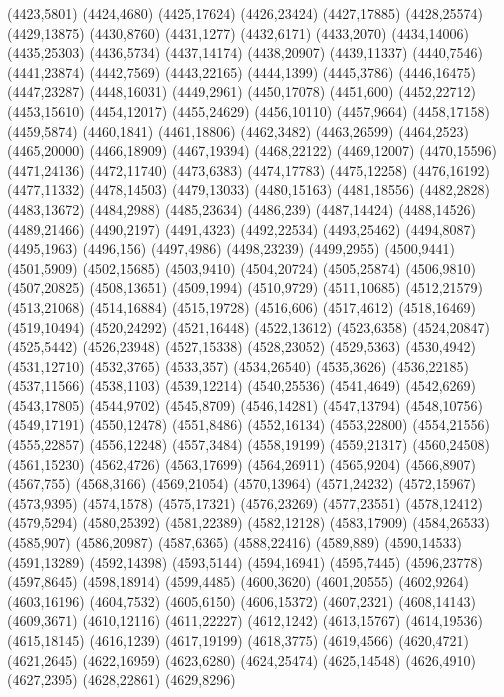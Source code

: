 (4423,5801)
(4424,4680)
(4425,17624)
(4426,23424)
(4427,17885)
(4428,25574)
(4429,13875)
(4430,8760)
(4431,1277)
(4432,6171)
(4433,2070)
(4434,14006)
(4435,25303)
(4436,5734)
(4437,14174)
(4438,20907)
(4439,11337)
(4440,7546)
(4441,23874)
(4442,7569)
(4443,22165)
(4444,1399)
(4445,3786)
(4446,16475)
(4447,23287)
(4448,16031)
(4449,2961)
(4450,17078)
(4451,600)
(4452,22712)
(4453,15610)
(4454,12017)
(4455,24629)
(4456,10110)
(4457,9664)
(4458,17158)
(4459,5874)
(4460,1841)
(4461,18806)
(4462,3482)
(4463,26599)
(4464,2523)
(4465,20000)
(4466,18909)
(4467,19394)
(4468,22122)
(4469,12007)
(4470,15596)
(4471,24136)
(4472,11740)
(4473,6383)
(4474,17783)
(4475,12258)
(4476,16192)
(4477,11332)
(4478,14503)
(4479,13033)
(4480,15163)
(4481,18556)
(4482,2828)
(4483,13672)
(4484,2988)
(4485,23634)
(4486,239)
(4487,14424)
(4488,14526)
(4489,21466)
(4490,2197)
(4491,4323)
(4492,22534)
(4493,25462)
(4494,8087)
(4495,1963)
(4496,156)
(4497,4986)
(4498,23239)
(4499,2955)
(4500,9441)
(4501,5909)
(4502,15685)
(4503,9410)
(4504,20724)
(4505,25874)
(4506,9810)
(4507,20825)
(4508,13651)
(4509,1994)
(4510,9729)
(4511,10685)
(4512,21579)
(4513,21068)
(4514,16884)
(4515,19728)
(4516,606)
(4517,4612)
(4518,16469)
(4519,10494)
(4520,24292)
(4521,16448)
(4522,13612)
(4523,6358)
(4524,20847)
(4525,5442)
(4526,23948)
(4527,15338)
(4528,23052)
(4529,5363)
(4530,4942)
(4531,12710)
(4532,3765)
(4533,357)
(4534,26540)
(4535,3626)
(4536,22185)
(4537,11566)
(4538,1103)
(4539,12214)
(4540,25536)
(4541,4649)
(4542,6269)
(4543,17805)
(4544,9702)
(4545,8709)
(4546,14281)
(4547,13794)
(4548,10756)
(4549,17191)
(4550,12478)
(4551,8486)
(4552,16134)
(4553,22800)
(4554,21556)
(4555,22857)
(4556,12248)
(4557,3484)
(4558,19199)
(4559,21317)
(4560,24508)
(4561,15230)
(4562,4726)
(4563,17699)
(4564,26911)
(4565,9204)
(4566,8907)
(4567,755)
(4568,3166)
(4569,21054)
(4570,13964)
(4571,24232)
(4572,15967)
(4573,9395)
(4574,1578)
(4575,17321)
(4576,23269)
(4577,23551)
(4578,12412)
(4579,5294)
(4580,25392)
(4581,22389)
(4582,12128)
(4583,17909)
(4584,26533)
(4585,907)
(4586,20987)
(4587,6365)
(4588,22416)
(4589,889)
(4590,14533)
(4591,13289)
(4592,14398)
(4593,5144)
(4594,16941)
(4595,7445)
(4596,23778)
(4597,8645)
(4598,18914)
(4599,4485)
(4600,3620)
(4601,20555)
(4602,9264)
(4603,16196)
(4604,7532)
(4605,6150)
(4606,15372)
(4607,2321)
(4608,14143)
(4609,3671)
(4610,12116)
(4611,22227)
(4612,1242)
(4613,15767)
(4614,19536)
(4615,18145)
(4616,1239)
(4617,19199)
(4618,3775)
(4619,4566)
(4620,4721)
(4621,2645)
(4622,16959)
(4623,6280)
(4624,25474)
(4625,14548)
(4626,4910)
(4627,2395)
(4628,22861)
(4629,8296)
